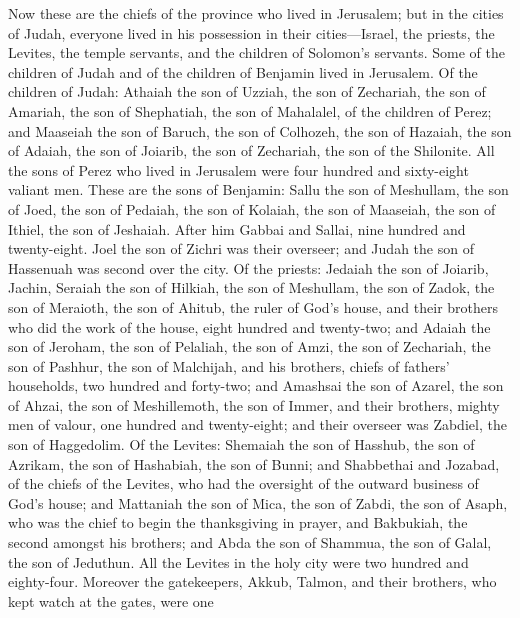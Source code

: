  Now these are the chiefs of the province who lived in
Jerusalem; but in the cities of Judah, everyone lived in his possession
in their cities---Israel, the priests, the Levites, the temple servants,
and the children of Solomon's servants.  Some of the
children of Judah and of the children of Benjamin lived in Jerusalem. Of
the children of Judah: Athaiah the son of Uzziah, the son of Zechariah,
the son of Amariah, the son of Shephatiah, the son of Mahalalel, of the
children of Perez;  and Maaseiah the son of Baruch, the
son of Colhozeh, the son of Hazaiah, the son of Adaiah, the son of
Joiarib, the son of Zechariah, the son of the Shilonite. 
All the sons of Perez who lived in Jerusalem were four hundred and
sixty-eight valiant men.  These are the sons of Benjamin:
Sallu the son of Meshullam, the son of Joed, the son of Pedaiah, the son
of Kolaiah, the son of Maaseiah, the son of Ithiel, the son of Jeshaiah.
 After him Gabbai and Sallai, nine hundred and
twenty-eight.  Joel the son of Zichri was their overseer;
and Judah the son of Hassenuah was second over the city. 
Of the priests: Jedaiah the son of Joiarib, Jachin, 
Seraiah the son of Hilkiah, the son of Meshullam, the son of Zadok, the
son of Meraioth, the son of Ahitub, the ruler of God's house,
 and their brothers who did the work of the house, eight
hundred and twenty-two; and Adaiah the son of Jeroham, the son of
Pelaliah, the son of Amzi, the son of Zechariah, the son of Pashhur, the
son of Malchijah,  and his brothers, chiefs of fathers'
households, two hundred and forty-two; and Amashsai the son of Azarel,
the son of Ahzai, the son of Meshillemoth, the son of Immer,
 and their brothers, mighty men of valour, one hundred
and twenty-eight; and their overseer was Zabdiel, the son of Haggedolim.
 Of the Levites: Shemaiah the son of Hasshub, the son of
Azrikam, the son of Hashabiah, the son of Bunni;  and
Shabbethai and Jozabad, of the chiefs of the Levites, who had the
oversight of the outward business of God's house;  and
Mattaniah the son of Mica, the son of Zabdi, the son of Asaph, who was
the chief to begin the thanksgiving in prayer, and Bakbukiah, the second
amongst his brothers; and Abda the son of Shammua, the son of Galal, the
son of Jeduthun.  All the Levites in the holy city were
two hundred and eighty-four.  Moreover the gatekeepers,
Akkub, Talmon, and their brothers, who kept watch at the gates, were one
